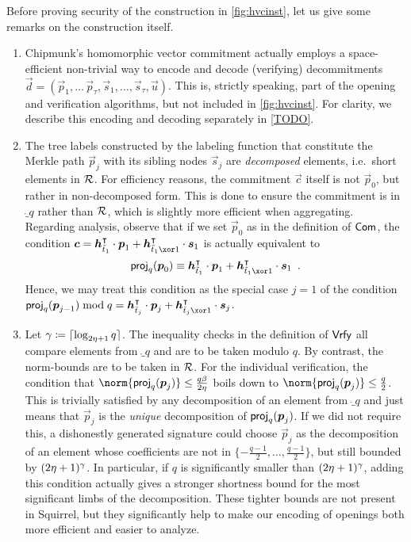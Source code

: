 \begin{remark}\label{rmk:hvc}
Before proving security of the construction in \autoref{fig:hvcinst}, let us give some remarks on the construction itself.
\begin{enumerate}
\item Chipmunk's homomorphic vector commitment actually employs a space-efficient non-trivial way to encode and decode (verifying) decommitments $\vec{d} = (\vec{p}_1,\ldots\,\vec{p}_\tau,\vec{s}_1,\ldots,\vec{s}_\tau,\vec{u})$.
This is, strictly speaking, part of the opening and verification algorithms, but not included in \autoref{fig:hvcinst}.
For clarity, we describe this encoding and decoding separately in \autoref{TODO}.
\item The tree labels constructed by the labeling function that constitute the Merkle path $\vec{p}_j$ with its sibling nodes $\vec{s}_j$ are \emph{decomposed} elements, i.e.\ short elements in $\mathcal{R}$.
For efficiency reasons, the commitment $\vec{c}$ itself is not $\vec{p}_0$, but rather in non-decomposed form. This is done to ensure the commitment is in $\ring_q$ rather than $\mathcal{R}$, which is slightly more efficient when aggregating.
Regarding analysis, observe that if we set $\vec{p}_0$ as in the definition of $\mathsf{Com}$, the condition $\vec{c} = \vec{h}_{\tilde t_1}^\transpose\cdot \vec{p}_{1} + \vec{h}_{\tilde t_1 \xor 1}^\transpose \cdot \vec{s}_{1}$ is actually equivalent to
\[
\proj_q(\vec{p}_0) \equiv \vec{h}_{\tilde t_1}^\transpose\cdot \vec{p}_{1} + \vec{h}_{\tilde t_1 \xor 1}^\transpose \cdot \vec{s}_{1}\enspace.
\]
Hence, we may treat this condition as the special case $j=1$ of the condition $\proj_q(\vec{p}_{j-1}) \bmod q = \vec{h}_{\tilde t_j}^\transpose\cdot \vec{p}_{j} + \vec{h}_{\tilde t_j \xor 1}^\transpose \cdot \vec{s}_{j}$.
\item Let $\gamma \coloneqq \lceil \log_{2\eta+1} q\rceil$.
The inequality checks in the definition of $\mathsf{Vrfy}$ all compare elements from $\ring_q$ and are to be taken modulo $q$. By contrast, the norm-bounds are to be taken in $\mathcal{R}$.
For the individual verification, the condition that $\norm{\proj_q(\vec{p}_j)} \leq \tfrac{q\beta}{2\eta}$ boils down to $\norm{\proj_q(\vec{p}_j)} \leq \tfrac{q}{2}$.
This is trivially satisfied by any decomposition of an element from $\ring_q$ and just means that $\vec{p}_j$ is the \emph{unique} decomposition of $\mathsf{proj}_q(\boldsymbol{p}_j)$.
If we did not require this, a dishonestly generated signature could choose $\vec{p}_j$ as the decomposition of an element whose coefficients are not in $\{-\tfrac{q-1}{2},\ldots,\tfrac{q-1}{2}\}$, but still bounded by $(2\eta+1)^\gamma$.
In particular, if $q$ is significantly smaller than $(2\eta+1)^\gamma$, adding this condition actually gives a stronger shortness bound for the most significant limbs of the decomposition.
These tighter bounds are not present in Squirrel, but they significantly help to make our encoding of openings both more efficient and easier to analyze.
\end{enumerate}
\end{remark}

